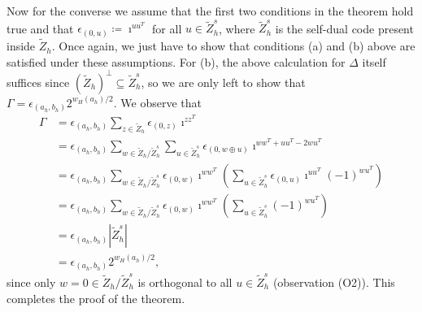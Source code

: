 \documentclass[twoside,romanappendices]{IEEEtran}
\begin{document}
Now for the converse we assume that the first two conditions in the theorem hold true and that $\epsilon_{(0,u)} \coloneqq \imath^{uu^T}$ for all $u \in \tilde{Z}_h^{s}$, where $\tilde{Z}_h^{s}$ is the self-dual code present inside $\tilde{Z}_h$.
Once again, we just have to show that conditions (a) and (b) above are satisfied under these assumptions.
For (b), the above calculation for $\Delta$ itself suffices since $(\tilde{Z}_h)^{\perp} \subseteq \tilde{Z}_h^s$, so we are only left to show that $\Gamma = \epsilon_{(a_h, b_h)} 2^{w_H(a_h)/2}$.
We observe that
\begin{align}
\Gamma & = \epsilon_{(a_h, b_h)} \sum_{z \in \tilde{Z}_h} \epsilon_{(0,z)} \imath^{zz^T} \\
%
  & = \epsilon_{(a_h, b_h)} \sum_{w \in \tilde{Z}_h/\tilde{Z}_h^s} \sum_{u \in \tilde{Z}_h^s} \epsilon_{(0,w \oplus u)} \imath^{ww^T + uu^T - 2wu^T} \\
  & = \epsilon_{(a_h, b_h)} \sum_{w \in \tilde{Z}_h/\tilde{Z}_h^s} \epsilon_{(0,w)} \imath^{ww^T} 
  \left( \sum_{u \in \tilde{Z}_h^s} \epsilon_{(0,u)} \imath^{uu^T} (-1)^{wu^T} \right) \\
  & = \epsilon_{(a_h, b_h)} \sum_{w \in \tilde{Z}_h/\tilde{Z}_h^s} \epsilon_{(0,w)} \imath^{ww^T} 
  \left( \sum_{u \in \tilde{Z}_h^s} (-1)^{wu^T} \right) \\
  & = \epsilon_{(a_h, b_h)} |\tilde{Z}_h^s| \\
  & = \epsilon_{(a_h, b_h)} 2^{w_H(a_h)/2},
\end{align}
since only $w = 0 \in \tilde{Z}_h/\tilde{Z}_h^s$ is orthogonal to all $u \in \tilde{Z}_h^s$ (observation (O2)).
This completes the proof of the theorem. \hfill \IEEEQEDhere


\end{document}
